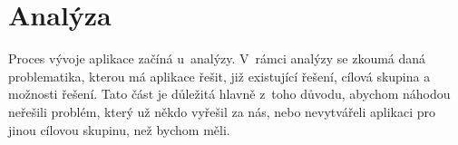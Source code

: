 \chapter{Analýza}
\label{ch:analysis}
Proces vývoje aplikace začíná u~analýzy. V~rámci analýzy se zkoumá daná problematika, kterou má aplikace řešit, již existující řešení, cílová skupina a možnosti řešení. Tato část je důležitá hlavně z~toho důvodu, abychom náhodou neřešili problém, který už někdo vyřešil za nás, nebo nevytvářeli aplikaci pro jinou cílovou skupinu, než bychom měli.








